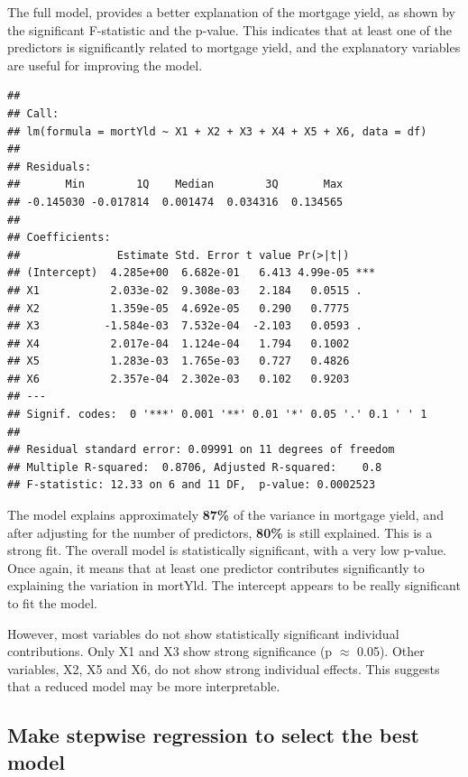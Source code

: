 \documentclass[
  11pt,
]{article}
\begin{document}
The full model, provides a better explanation of the mortgage yield, as
shown by the significant F-statistic and the p-value. This indicates
that at least one of the predictors is significantly related to mortgage
yield, and the explanatory variables are useful for improving the model.

\begin{verbatim}
## 
## Call:
## lm(formula = mortYld ~ X1 + X2 + X3 + X4 + X5 + X6, data = df)
## 
## Residuals:
##       Min        1Q    Median        3Q       Max 
## -0.145030 -0.017814  0.001474  0.034316  0.134565 
## 
## Coefficients:
##               Estimate Std. Error t value Pr(>|t|)    
## (Intercept)  4.285e+00  6.682e-01   6.413 4.99e-05 ***
## X1           2.033e-02  9.308e-03   2.184   0.0515 .  
## X2           1.359e-05  4.692e-05   0.290   0.7775    
## X3          -1.584e-03  7.532e-04  -2.103   0.0593 .  
## X4           2.017e-04  1.124e-04   1.794   0.1002    
## X5           1.283e-03  1.765e-03   0.727   0.4826    
## X6           2.357e-04  2.302e-03   0.102   0.9203    
## ---
## Signif. codes:  0 '***' 0.001 '**' 0.01 '*' 0.05 '.' 0.1 ' ' 1
## 
## Residual standard error: 0.09991 on 11 degrees of freedom
## Multiple R-squared:  0.8706, Adjusted R-squared:    0.8 
## F-statistic: 12.33 on 6 and 11 DF,  p-value: 0.0002523
\end{verbatim}

The model explains approximately \textbf{87\%} of the variance in
mortgage yield, and after adjusting for the number of predictors,
\textbf{80\%} is still explained. This is a strong fit. The overall
model is statistically significant, with a very low p-value. Once again,
it means that at least one predictor contributes significantly to
explaining the variation in mortYld. The intercept appears to be really
significant to fit the model.

However, most variables do not show statistically significant individual
contributions. Only X1 and X3 show strong significance (p \(\approx\)
0.05). Other variables, X2, X5 and X6, do not show strong individual
effects. This suggests that a reduced model may be more interpretable.

\subsection{Make stepwise regression to select the best
model}\label{make-stepwise-regression-to-select-the-best-model}
\end{document}

